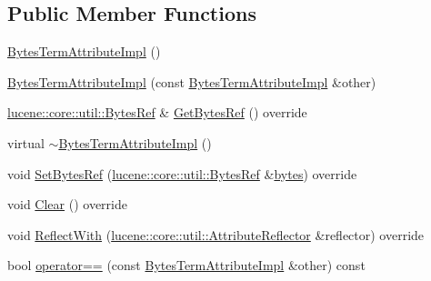 \subsection*{Public Member Functions}
\begin{DoxyCompactItemize}
\item 
\mbox{\hyperlink{classlucene_1_1core_1_1analysis_1_1tokenattributes_1_1BytesTermAttributeImpl_a615b3f72279153190787e471fcf1e550}{Bytes\+Term\+Attribute\+Impl}} ()
\item 
\mbox{\hyperlink{classlucene_1_1core_1_1analysis_1_1tokenattributes_1_1BytesTermAttributeImpl_a7fa1f130126d96924101d3ab9716f921}{Bytes\+Term\+Attribute\+Impl}} (const \mbox{\hyperlink{classlucene_1_1core_1_1analysis_1_1tokenattributes_1_1BytesTermAttributeImpl}{Bytes\+Term\+Attribute\+Impl}} \&other)
\item 
\mbox{\hyperlink{classlucene_1_1core_1_1util_1_1BytesRef}{lucene\+::core\+::util\+::\+Bytes\+Ref}} \& \mbox{\hyperlink{classlucene_1_1core_1_1analysis_1_1tokenattributes_1_1BytesTermAttributeImpl_ab0c78ee232b1546b553118afc0117374}{Get\+Bytes\+Ref}} () override
\item 
virtual \mbox{\hyperlink{classlucene_1_1core_1_1analysis_1_1tokenattributes_1_1BytesTermAttributeImpl_a03844cda01d3357b0e60ae4424fafc33}{$\sim$\+Bytes\+Term\+Attribute\+Impl}} ()
\item 
void \mbox{\hyperlink{classlucene_1_1core_1_1analysis_1_1tokenattributes_1_1BytesTermAttributeImpl_a132152487a88eae5feb1f88543d08c65}{Set\+Bytes\+Ref}} (\mbox{\hyperlink{classlucene_1_1core_1_1util_1_1BytesRef}{lucene\+::core\+::util\+::\+Bytes\+Ref}} \&\mbox{\hyperlink{classlucene_1_1core_1_1analysis_1_1tokenattributes_1_1BytesTermAttributeImpl_aedd53d552069d367ff2ede8111ce1944}{bytes}}) override
\item 
void \mbox{\hyperlink{classlucene_1_1core_1_1analysis_1_1tokenattributes_1_1BytesTermAttributeImpl_a6fa48596a507c937bd874d46ef5ca963}{Clear}} () override
\item 
void \mbox{\hyperlink{classlucene_1_1core_1_1analysis_1_1tokenattributes_1_1BytesTermAttributeImpl_a6a1789244604f807529de975d4c10171}{Reflect\+With}} (\mbox{\hyperlink{namespacelucene_1_1core_1_1util_a7dbb701adaed055f73fb95eec83da10a}{lucene\+::core\+::util\+::\+Attribute\+Reflector}} \&reflector) override
\item 
bool \mbox{\hyperlink{classlucene_1_1core_1_1analysis_1_1tokenattributes_1_1BytesTermAttributeImpl_a7cb94efc8c682f0caf2bca4f0ffb2981}{operator==}} (const \mbox{\hyperlink{classlucene_1_1core_1_1analysis_1_1tokenattributes_1_1BytesTermAttributeImpl}{Bytes\+Term\+Attribute\+Impl}} \&other) const

\end{DoxyCompactItemize}
